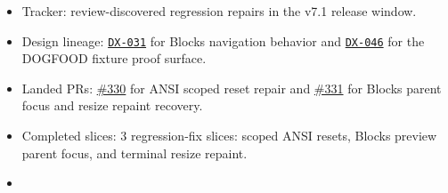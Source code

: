 \begin{itemize}
\tightlist
\item
  Tracker: review-discovered regression repairs in the v7.1 release window.
\item
  Design lineage: \href{https://github.com/flyingrobots/bijou/blob/cbd70612140e7a450d764b3c7be1c6af878b99bc/docs/design/DX-031-standard-bijou-blocks.md}{\texttt{D\allowbreak{}X\allowbreak{}-\allowbreak{}0\allowbreak{}3\allowbreak{}1}} for Blocks navigation behavior and \href{https://github.com/flyingrobots/bijou/blob/cbd70612140e7a450d764b3c7be1c6af878b99bc/docs/design/DX-046-graphql-authored-dogfood-block-fixture.md}{\texttt{D\allowbreak{}X\allowbreak{}-\allowbreak{}0\allowbreak{}4\allowbreak{}6}} for the DOGFOOD fixture proof surface.
\item
  Landed PRs: \href{https://github.com/flyingrobots/bijou/pull/330}{\#330} for ANSI scoped reset repair and \href{https://github.com/flyingrobots/bijou/pull/331}{\#331} for Blocks parent focus and resize repaint recovery.
\item
  Completed slices: 3 regression-fix slices: scoped ANSI resets, Blocks preview parent focus, and terminal resize repaint.
\item

\end{itemize}
